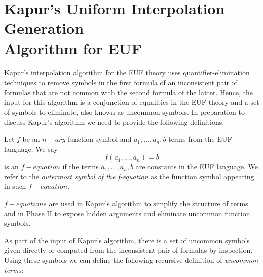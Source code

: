 \section{Kapur's Uniform Interpolation Generation \\ 
Algorithm for EUF}

Kapur's interpolation algorithm for the EUF theory uses quantifier-elimination
techniques to remove symbols in the first formula of an inconsistent pair of formulas
that are not common with the second formula of the latter. 
Hence, the input for this algorithm is a conjunction of equalities in the
EUF theory and a set of symbols to eliminate, also known as uncommon symbols.
In preparation to discuss Kapur's algorithm we need to provide the 
following definitions.

\begin{definition} 
  Let $f$ be an $n-ary$ function symbol and $a_1, \dots, a_n,
  b$ terms from the EUF language. We say 
  \begin{equation*}
    f(a_1, \dots, a_n) = b
  \end{equation*}
  is an $f-equation$ if the terms $a_1, \dots, a_n, b$ are constants in
  the EUF language. We refer to the \emph{outermost symbol of the f-equation}
  as the function symbol appearing in such $f-equation$.
\end{definition}

$f-equations$ are used in Kapur's algorithm to simplify the structure of terms 
and in Phase II to expose hidden arguments and eliminate uncommon function symbols.

As part of the input of Kapur's algorithm, there is a set of uncommon symbols given 
directly or computed from the inconsistent pair of formulas by inspection. Using
these symbols we can define the following recursive definition of \emph{uncommon terms}:

